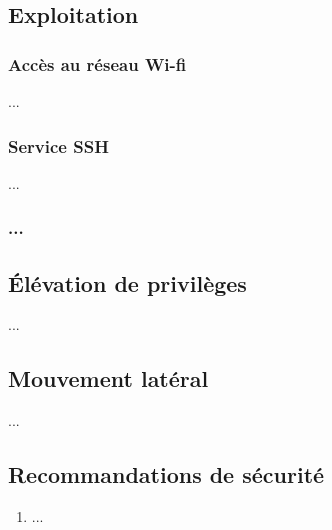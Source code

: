 \documentclass[french,oneside]{article}
\begin{document}
\subsection{Exploitation}



\subsubsection{Accès au réseau Wi-fi}

...



\subsubsection{Service SSH}

...



\subsubsection{...}










\subsection{Élévation de privilèges}

...










\subsection{Mouvement latéral}

...










\subsection{Recommandations de sécurité} \label{mesures}

\begin{enumerate}

\item ...

\end{enumerate}
\end{document}
